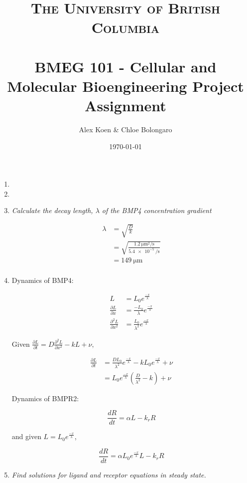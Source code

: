 \documentclass{article} %
\title{
  \normalfont \normalsize
  \textsc{The University of British Columbia} \\ [25pt] %
  \horrule{0.5pt} \\[0.4cm] %
  \huge BMEG 101 - Cellular and Molecular Bioengineering Project Assignment %
  \horrule{2pt} \\[0.5cm] %
}
\author{Alex Koen \& Chloe Bolongaro} %
\date{\normalsize \today} %
\begin{document}
\maketitle %

\onehalfspacing

\begin{enumerate}
    \item 
    \item 
    \item \textit{Calculate the decay length, $\lambda$ of the BMP4 concentration gradient}
    
    \begin{align*}
        \lambda &= \sqrt{\frac{D}{k}} \\
        &= \sqrt{\frac{\SI{1.2}{\micro\m^2\per\s}}{\SI{5.4e-5}{\per\s}}} \\
        &= \SI{149}{\micro\m} \\
    \end{align*}
    \item Dynamics of BMP4:
    
    \begin{align*}
        L &= L_0 e^{\frac{-x}{\lambda}} \\
        \frac{\partial L}{\partial x} &= \frac{-L_0}{\lambda}e^{\frac{-x}{\lambda}} \\
        \frac{\partial ^2L}{\partial x^2} &= \frac{L_0}{\lambda^2}e^{\frac{-x}{\lambda}}
    \end{align*}
    
    Given $\frac{\partial L }{\partial t} = D\frac{\partial^2 L}{\partial x^2}-kL+\nu,$
    
    \begin{align*}
        \frac{\partial L}{\partial t} &= \frac{DL_0}{\lambda^2}e^{\frac{-x}{\lambda}}-kL_0e^{\frac{-x}{\lambda}} + \nu \\
        &= L_0e^{\frac{-x}{\lambda}}\left(\frac{D}{\lambda^2} -k \right) + \nu
    \end{align*}
    
    Dynamics of BMPR2:

    $$ \frac{dR}{dt} = \alpha L-k_r R $$
        
    and given $L = L_0 e^{\frac{-x}{\lambda}}$,
    
    $$ \frac{dR}{dt} = \alpha L_0 e^{\frac{-x}{\lambda}} L-k_r R $$

  \item \textit{Find solutions for ligand and receptor equations in steady state.}


\end{enumerate}
\end{document}

